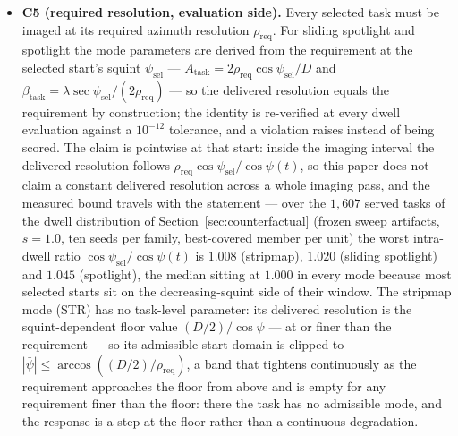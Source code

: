 \documentclass[preprint,authoryear]{elsarticle}
\begin{document}
\begin{itemize}
\item \textbf{C5 (required resolution, evaluation side).} Every selected task must be imaged at its required azimuth resolution $\rho_{\mathrm{req}}$. For sliding spotlight and spotlight the mode parameters are derived from the requirement at the selected start's squint $\psi_{\mathrm{sel}}$ --- $A_{\mathrm{task}}=2\rho_{\mathrm{req}}\cos\psi_{\mathrm{sel}}/D$ and $\beta_{\mathrm{task}}=\lambda\sec\psi_{\mathrm{sel}}/(2\rho_{\mathrm{req}})$ --- so the delivered resolution equals the requirement by construction; the identity is re-verified at every dwell evaluation against a $10^{-12}$ tolerance, and a violation raises instead of being scored. The claim is pointwise at that start: inside the imaging interval the delivered resolution follows $\rho_{\mathrm{req}}\cos\psi_{\mathrm{sel}}/\cos\psi(t)$, so this paper does not claim a constant delivered resolution across a whole imaging pass, and the measured bound travels with the statement --- over the $1{,}607$ served tasks of the dwell distribution of Section~\ref{sec:counterfactual} (frozen sweep artifacts, $s=1.0$, ten seeds per family, best-covered member per unit) the worst intra-dwell ratio $\cos\psi_{\mathrm{sel}}/\cos\psi(t)$ is $1.008$ (stripmap), $1.020$ (sliding spotlight) and $1.045$ (spotlight), the median sitting at $1.000$ in every mode because most selected starts sit on the decreasing-squint side of their window. The stripmap mode (STR) has no task-level parameter: its delivered resolution is the squint-dependent floor value $(D/2)/\cos\bar\psi$ --- at or finer than the requirement --- so its admissible start domain is clipped to $|\bar\psi|\le\arccos((D/2)/\rho_{\mathrm{req}})$, a band that tightens continuously as the requirement approaches the floor from above and is empty for any requirement finer than the floor: there the task has no admissible mode, and the response is a step at the floor rather than a continuous degradation.
\end{itemize}
\end{document}
